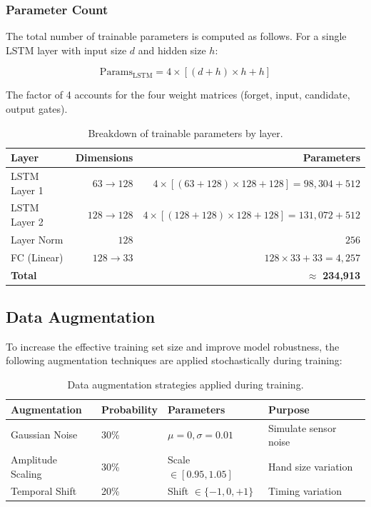 \documentclass[12pt, a4paper]{article}
\begin{document}
\subsubsection{Parameter Count}

The total number of trainable parameters is computed as follows. For a single LSTM layer with input size $d$ and hidden size $h$:

\begin{equation}
    \text{Params}_{\text{LSTM}} = 4 \times [(d + h) \times h + h]
    \label{eq:lstm_params}
\end{equation}

The factor of 4 accounts for the four weight matrices (forget, input, candidate, output gates).

\begin{table}[H]
    \centering
    \caption{Breakdown of trainable parameters by layer.}
    \label{tab:params}
    \begin{tabular}{lrr}
        \toprule
        \textbf{Layer} & \textbf{Dimensions} & \textbf{Parameters} \\
        \midrule
        LSTM Layer 1 & $63 \to 128$ & $4 \times [(63+128) \times 128 + 128] = 98{,}304 + 512$ \\
        LSTM Layer 2 & $128 \to 128$ & $4 \times [(128+128) \times 128 + 128] = 131{,}072 + 512$ \\
        Layer Norm   & $128$ & $256$ \\
        FC (Linear)  & $128 \to 33$ & $128 \times 33 + 33 = 4{,}257$ \\
        \midrule
        \textbf{Total} & & $\approx$ \textbf{234{,}913} \\
        \bottomrule
    \end{tabular}
\end{table}

\subsection{Data Augmentation}
\label{sec:augmentation}

To increase the effective training set size and improve model robustness, the following augmentation techniques are applied stochastically during training:

\begin{table}[H]
    \centering
    \caption{Data augmentation strategies applied during training.}
    \label{tab:augmentation}
    \begin{tabular}{llll}
        \toprule
        \textbf{Augmentation} & \textbf{Probability} & \textbf{Parameters} & \textbf{Purpose} \\
        \midrule
        Gaussian Noise & 30\% & $\mu=0, \sigma=0.01$ & Simulate sensor noise \\
        Amplitude Scaling & 30\% & Scale $\in [0.95, 1.05]$ & Hand size variation \\
        Temporal Shift & 20\% & Shift $\in \{-1, 0, +1\}$ & Timing variation \\
        \bottomrule
    \end{tabular}
\end{table}
\end{document}
